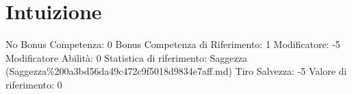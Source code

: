 \section{Intuizione}\label{intuizione}

\begin{description}
\tightlist
\item[Tags: ABI]
No Bonus Competenza: 0 Bonus Competenza di Riferimento: 1 Modificatore:
-5 Modificatore Abilità: 0 Statistica di riferimento: Saggezza
(Saggezza\%200a3bd56da49c472c9f5018d9834e7aff.md) Tiro Salvezza: -5
Valore di riferimento: 0
\end{description}
